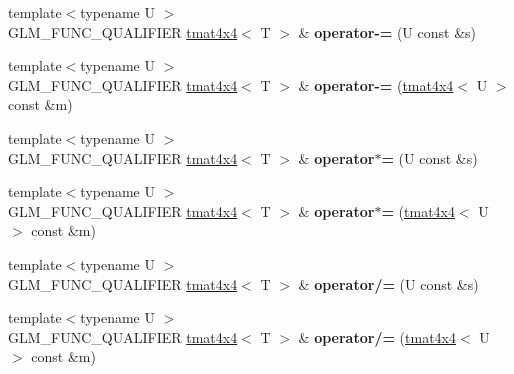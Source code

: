 \begin{DoxyCompactItemize}
\item 
\hypertarget{structglm_1_1detail_1_1tmat4x4_a4ee5d7f6aa93a3c6c816514b804e6de7}{{\footnotesize template$<$typename U $>$ }\\G\-L\-M\-\_\-\-F\-U\-N\-C\-\_\-\-Q\-U\-A\-L\-I\-F\-I\-E\-R \hyperlink{structglm_1_1detail_1_1tmat4x4}{tmat4x4}$<$ T $>$ \& {\bfseries operator-\/=} (U const \&s)}\label{structglm_1_1detail_1_1tmat4x4_a4ee5d7f6aa93a3c6c816514b804e6de7}

\item 
\hypertarget{structglm_1_1detail_1_1tmat4x4_a8f63e9aac83bd9ec75b6f3b53d02c201}{{\footnotesize template$<$typename U $>$ }\\G\-L\-M\-\_\-\-F\-U\-N\-C\-\_\-\-Q\-U\-A\-L\-I\-F\-I\-E\-R \hyperlink{structglm_1_1detail_1_1tmat4x4}{tmat4x4}$<$ T $>$ \& {\bfseries operator-\/=} (\hyperlink{structglm_1_1detail_1_1tmat4x4}{tmat4x4}$<$ U $>$ const \&m)}\label{structglm_1_1detail_1_1tmat4x4_a8f63e9aac83bd9ec75b6f3b53d02c201}

\item 
\hypertarget{structglm_1_1detail_1_1tmat4x4_a48b13d6f9fb0262bb9e1ed0429be0250}{{\footnotesize template$<$typename U $>$ }\\G\-L\-M\-\_\-\-F\-U\-N\-C\-\_\-\-Q\-U\-A\-L\-I\-F\-I\-E\-R \hyperlink{structglm_1_1detail_1_1tmat4x4}{tmat4x4}$<$ T $>$ \& {\bfseries operator$\ast$=} (U const \&s)}\label{structglm_1_1detail_1_1tmat4x4_a48b13d6f9fb0262bb9e1ed0429be0250}

\item 
\hypertarget{structglm_1_1detail_1_1tmat4x4_a322c4f8d69e070ccbd0af38d809761aa}{{\footnotesize template$<$typename U $>$ }\\G\-L\-M\-\_\-\-F\-U\-N\-C\-\_\-\-Q\-U\-A\-L\-I\-F\-I\-E\-R \hyperlink{structglm_1_1detail_1_1tmat4x4}{tmat4x4}$<$ T $>$ \& {\bfseries operator$\ast$=} (\hyperlink{structglm_1_1detail_1_1tmat4x4}{tmat4x4}$<$ U $>$ const \&m)}\label{structglm_1_1detail_1_1tmat4x4_a322c4f8d69e070ccbd0af38d809761aa}

\item 
\hypertarget{structglm_1_1detail_1_1tmat4x4_a4a5f881cf19a066120b4ae9aa2951fad}{{\footnotesize template$<$typename U $>$ }\\G\-L\-M\-\_\-\-F\-U\-N\-C\-\_\-\-Q\-U\-A\-L\-I\-F\-I\-E\-R \hyperlink{structglm_1_1detail_1_1tmat4x4}{tmat4x4}$<$ T $>$ \& {\bfseries operator/=} (U const \&s)}\label{structglm_1_1detail_1_1tmat4x4_a4a5f881cf19a066120b4ae9aa2951fad}

\item 
\hypertarget{structglm_1_1detail_1_1tmat4x4_a6f7b84c73c5682c67e6a4c1d138c022f}{{\footnotesize template$<$typename U $>$ }\\G\-L\-M\-\_\-\-F\-U\-N\-C\-\_\-\-Q\-U\-A\-L\-I\-F\-I\-E\-R \hyperlink{structglm_1_1detail_1_1tmat4x4}{tmat4x4}$<$ T $>$ \& {\bfseries operator/=} (\hyperlink{structglm_1_1detail_1_1tmat4x4}{tmat4x4}$<$ U $>$ const \&m)}\label{structglm_1_1detail_1_1tmat4x4_a6f7b84c73c5682c67e6a4c1d138c022f}

\end{DoxyCompactItemize}

